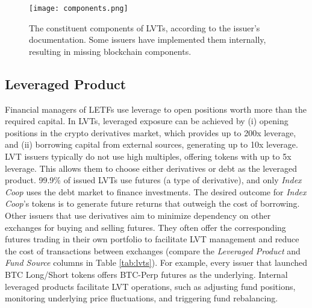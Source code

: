 \begin{figure}[t]
	\centering
	\texttt{[image: components.png]}
	\caption[LVT constituent components]{The constituent components of LVTs, according to the issuer's documentation. Some issuers have implemented them internally, resulting in missing blockchain components.}
	\label{fig:components}
\end{figure}

\subsection{Leveraged Product}\label{subsec:leveragedproduct}
Financial managers of LETFs use leverage to open positions worth more than the required capital. In LVTs, leveraged exposure can be achieved by (i) opening positions in the crypto derivatives market, which provides up to 200x leverage, and (ii) borrowing capital from external sources, generating up to 10x leverage. LVT issuers typically do not use high multiples, offering tokens with up to 5x leverage. This allows them to choose either derivatives or debt as the leveraged product. 99.9\% of issued LVTs use futures (a type of derivative), and only \textsl{Index Coop} uses the debt market to finance investments. The desired outcome for \textsl{Index Coop}'s tokens is to generate future returns that outweigh the cost of borrowing. Other issuers that use derivatives aim to minimize dependency on other exchanges for buying and selling futures. They often offer the corresponding futures trading in their own portfolio to facilitate LVT management and reduce the cost of transactions between exchanges (compare the \textsl{Leveraged Product} and \textsl{Fund Source} columns in Table \ref{tab:lvts}). For example, every issuer that launched BTC Long/Short tokens offers BTC-Perp futures as the underlying. Internal leveraged products facilitate LVT operations, such as adjusting fund positions, monitoring underlying price fluctuations, and triggering fund rebalancing.

